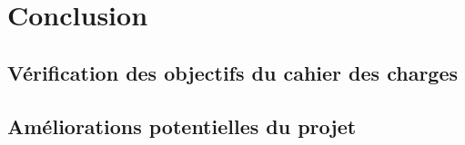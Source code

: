 \section{Conclusion}
\subsection{Vérification des objectifs du cahier des charges}


\subsection{Améliorations potentielles du projet}


